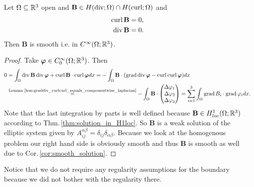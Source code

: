\documentclass[../master_thesis.tex]{subfiles}
\begin{document}
\begin{theorem}\label{thm:smoothness_of_solutions}
    Let $\Omega \subseteq \mathbb{R}^3$ open and 
    $\mathbf{B} \in H(\operatorname{div};\Omega) \cap H(\operatorname{curl};\Omega)$ and 
    \begin{align*}
        \operatorname{curl} \mathbf{B} &= 0,
        \\ \operatorname{div} \mathbf{B} &= 0.
    \end{align*}
    Then $\mathbf{B}$ is smooth i.e. in $C^\infty(\Omega;\mathbb{R}^3)$.
\end{theorem}
\begin{proof}
    Take $\bm{\varphi} \in C_0^\infty(\Omega;\mathbb{R}^3)$. Then 
    \begin{align*}
        0 &= \int_\Omega \operatorname{div} \mathbf{B} \operatorname{div} \bm{\varphi} + \operatorname{curl} \mathbf{B} \cdot \operatorname{curl} \bm{\varphi} dx
        = - \int_\Omega \mathbf{B} \cdot (\operatorname{grad} \operatorname{div} \bm{\varphi} - \operatorname{curl} \operatorname{curl} \bm{\varphi}) dx
        \\ &\stackrel{\text{Lemma 
            \ref{lem:graddiv_curlcurl_equals_componentwise_laplacian}}}{=} 
            - \int_\Omega \mathbf{B} \cdot 
            \begin{pmatrix}
                \Delta \varphi_1 \\ \Delta \varphi_2 \\ \Delta \varphi_3
            \end{pmatrix}
        = \sum\limits_{i=1}^3 \int_\Omega \operatorname{grad} B_i \cdot \operatorname{grad} \varphi_i dx.
    \end{align*}
    Note that the last integration by parts is well defined because 
    $\mathbf{B} \in H^1_{loc}(\Omega;\mathbb{R}^3)$ according to Thm.\,\ref{thm:solution_in_H1loc}. 
    So $\mathbf{B}$ is a weak solution 
    of the elliptic system given by 
    $A_{ij}^{\alpha \beta} = \delta_{ij} \delta_{\alpha\beta}$. Because 
    we look at the homogenous problem our right hand side is obviously smooth 
    and thus $\mathbf{B}$ is smooth as well due to Cor.\,\ref{cor:smooth_solution}.
\end{proof}

\begin{remark}
    Notice that we do not require any regularity assumptions for the boundary 
    because we did not bother with the regularity there. 
\end{remark}

\end{document}
